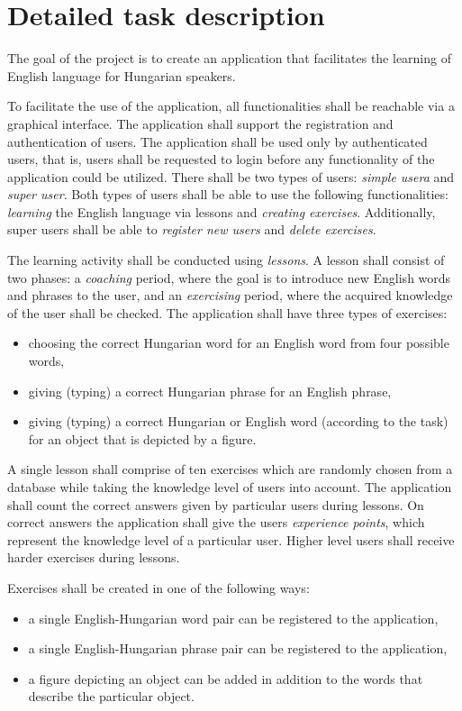 \documentclass[a4paper]{article}
\begin{document}
	\section{Detailed task description}
	The goal of the project is to create an application that facilitates the learning of English language for Hungarian speakers.
	
	To facilitate the use of the application, all functionalities shall be reachable via a graphical interface. The application shall support the registration and authentication of users. The application shall be used only by authenticated users, that is,  users shall be requested to login before any functionality of the application could be utilized. There shall be two types of users: \textsl{simple usera} and \textsl{super user}. Both types of users shall be able to use the following functionalities: \emph{learning} the English language via lessons and \emph{creating exercises}. Additionally, super users shall be able to \emph{register new users} and \emph{delete exercises}.
	
	The learning activity shall be conducted using \emph{lessons}. A lesson shall consist of two phases: a \emph{coaching} period, where the goal is to introduce new English words and phrases to the user, and an \emph{exercising} period, where the acquired knowledge of the user shall be checked. The application shall have three types of exercises:
	\begin{itemize}
		\item choosing the correct Hungarian word for an English word from four possible words,
		\item giving (typing) a correct Hungarian phrase for an English phrase,
		\item giving (typing) a correct Hungarian or English word (according to the task) for an object that is depicted by a figure.
	\end{itemize}
	A single lesson shall comprise of ten exercises which are randomly chosen from a database while taking the knowledge level of users into account. The application shall count the correct answers given by particular users during lessons. On correct answers the application shall give the users \emph{experience points}, which represent the knowledge level of a particular user. Higher level users shall receive harder exercises during lessons. 

	Exercises shall be created in one of the following ways:
	\begin{itemize}
		\item a single English-Hungarian word pair can be registered to the application,
		\item a single English-Hungarian phrase pair can be registered to the application,
		\item a figure depicting an object can be added in addition to the words that describe the particular object.
	\end{itemize}
	
\end{document}
